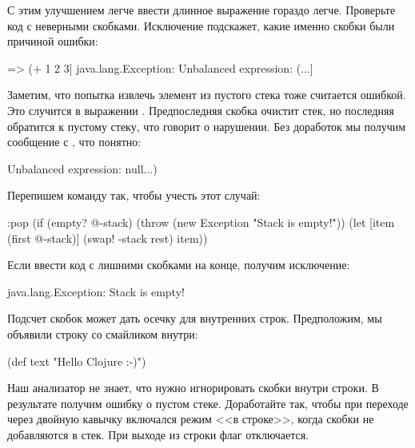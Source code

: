 С этим улучшением легче ввести длинное выражение гораздо легче. Проверьте код с неверными скобками. Исключение подскажет, какие именно скобки были причиной ошибки:

\begin{english}
  \begin{clojure}
=> (+ 1 2 3]
java.lang.Exception: Unbalanced expression: (...]
  \end{clojure}
\end{english}

Заметим, что попытка извлечь элемент из пустого стека тоже считается ошибкой. Это случится в выражении . Предпоследняя скобка очистит стек, но последняя обратится к пустому стеку, что говорит о нарушении. Без доработок мы получим сообщение с , что понятно:

\begin{english}
  \begin{clojure}
Unbalanced expression: null...)
  \end{clojure}
\end{english}

Перепишем команду  так, чтобы учесть этот случай:

\begin{english}
  \begin{clojure}
:pop (if (empty? @-stack)
       (throw (new Exception "Stack is empty!"))
       (let [item (first @-stack)]
         (swap! -stack rest)
         item))
  \end{clojure}
\end{english}

Если ввести код с лишними скобками на конце, получим исключение:

\begin{english}
  \begin{text}
java.lang.Exception: Stack is empty!
  \end{text}
\end{english}

Подсчет скобок может дать осечку для внутренних строк. Предположим, мы объявили строку со смайликом внутри:

\begin{english}
  \begin{clojure}
(def text "Hello Clojure :-)")
  \end{clojure}
\end{english}

Наш анализатор не знает, что нужно игнорировать скобки внутри строки. В результате получим ошибку о пустом стеке. Доработайте  так, чтобы при переходе через двойную кавычку включался режим <<в строке>>, когда скобки не добавляются в стек. При выходе из строки флаг отключается.

